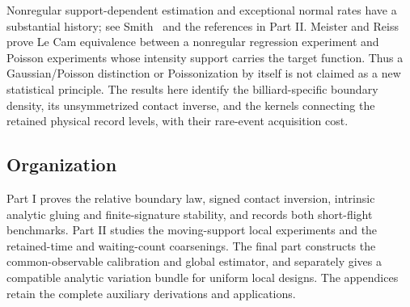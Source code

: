 Nonregular support-dependent estimation and exceptional normal rates have a
substantial history; see Smith~\cite{Smith1985} and the references in Part II.
Meister and Reiss~\cite{MeisterReiss} prove Le Cam equivalence between a
nonregular regression experiment and Poisson experiments whose intensity
support carries the target function.  Thus a Gaussian/Poisson distinction or
Poissonization by itself is not claimed as a new statistical principle.
The results here identify the billiard-specific boundary density, its
unsymmetrized contact inverse, and the kernels connecting the retained
physical record levels, with their rare-event acquisition cost.

\subsection{Organization}

Part I proves the relative boundary law, signed contact inversion, intrinsic
analytic gluing and finite-signature stability, and records both short-flight
benchmarks.  Part II studies the moving-support local experiments and the
retained-time and waiting-count coarsenings.  The final part constructs the
common-observable calibration and global estimator, and separately gives a
compatible analytic variation bundle for uniform local designs.  The
appendices retain the complete auxiliary derivations and applications.
